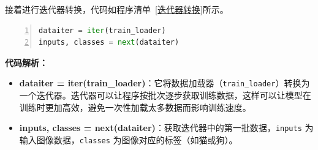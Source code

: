 接着进行迭代器转换，代码如程序清单~\ref{迭代器转换}所示。
\begin{lstlisting}[language={python},label={迭代器转换},caption={迭代器转换}, basicstyle=\footnotesize\ttfamily, breaklines=true, numbers=left, frame=single,keepspaces=true,showstringspaces=false]
dataiter = iter(train_loader)
inputs, classes = next(dataiter)
\end{lstlisting}
\textbf{代码解析：}
\begin{itemize}
    \item \textbf{dataiter = iter(train\_loader)}：它将数据加载器（\texttt{train\_loader}）转换为一个迭代器。迭代器可以让程序按批次逐步获取训练数据，这样可以让模型在训练时更加高效，避免一次性加载太多数据而影响训练速度。

    \item \textbf{inputs, classes = next(dataiter)}：获取迭代器中的第一批数据，\texttt{inputs} 为输入图像数据，\texttt{classes} 为图像对应的标签（如猫或狗）。
\end{itemize} 

